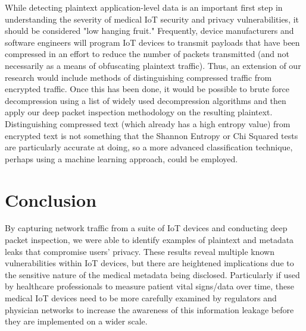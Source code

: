While detecting plaintext application-level data is an important first step in understanding the severity of medical IoT security and privacy vulnerabilities, it should be considered "low hanging fruit." Frequently, device manufacturers and software engineers will program IoT devices to transmit payloads that have been compressed in an effort to reduce the number of packets transmitted (and not necessarily as a means of obfuscating plaintext traffic). Thus, an extension of our research would include methods of distinguishing compressed traffic from encrypted traffic. Once this has been done, it would be possible to brute force decompression using a list of widely used decompression algorithms and then apply our deep packet inspection methodology on the resulting plaintext. Distinguishing compressed text (which already has a high entropy value) from encrypted text is not something that the Shannon Entropy or Chi Squared tests are particularly accurate at doing, so a more advanced classification technique, perhaps using a machine learning approach, could be employed. 

\section{Conclusion}

By capturing network traffic from a suite of IoT devices and conducting deep packet inspection, we were able to identify examples of plaintext and metadata leaks that compromise users' privacy. These results reveal multiple known vulnerabilities within IoT devices, but there are heightened implications due to the sensitive nature of the medical metadata being disclosed. Particularly if used by healthcare professionals to measure patient vital signs/data over time, these medical IoT devices need to be more carefully examined by regulators and physician networks to increase the awareness of this information leakage before they are implemented on a wider scale. 

